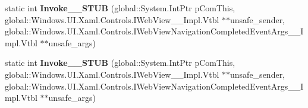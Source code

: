 \begin{DoxyCompactItemize}
\mbox{\label{struct_windows_1_1_foundation_1_1_typed_event_handler___a___windows___u_i___xaml___controls___we5456bcb78d92d2dc8a40fc7f9961d992_a37282d91d6909a406e43c36dbe1e2da0}} 
static int {\bfseries Invoke\+\_\+\+\_\+\+S\+T\+UB} (global\+::\+System.\+Int\+Ptr p\+Com\+This, global\+::\+Windows.\+U\+I.\+Xaml.\+Controls.\+I\+Web\+View\+\_\+\+\_\+\+Impl.\+Vtbl $\ast$$\ast$unsafe\+\_\+sender, global\+::\+Windows.\+U\+I.\+Xaml.\+Controls.\+I\+Web\+View\+Navigation\+Completed\+Event\+Args\+\_\+\+\_\+\+Impl.\+Vtbl $\ast$$\ast$unsafe\+\_\+args)
\item 
\mbox{\label{struct_windows_1_1_foundation_1_1_typed_event_handler___a___windows___u_i___xaml___controls___we5456bcb78d92d2dc8a40fc7f9961d992_a37282d91d6909a406e43c36dbe1e2da0}} 
static int {\bfseries Invoke\+\_\+\+\_\+\+S\+T\+UB} (global\+::\+System.\+Int\+Ptr p\+Com\+This, global\+::\+Windows.\+U\+I.\+Xaml.\+Controls.\+I\+Web\+View\+\_\+\+\_\+\+Impl.\+Vtbl $\ast$$\ast$unsafe\+\_\+sender, global\+::\+Windows.\+U\+I.\+Xaml.\+Controls.\+I\+Web\+View\+Navigation\+Completed\+Event\+Args\+\_\+\+\_\+\+Impl.\+Vtbl $\ast$$\ast$unsafe\+\_\+args)
\end{DoxyCompactItemize}
